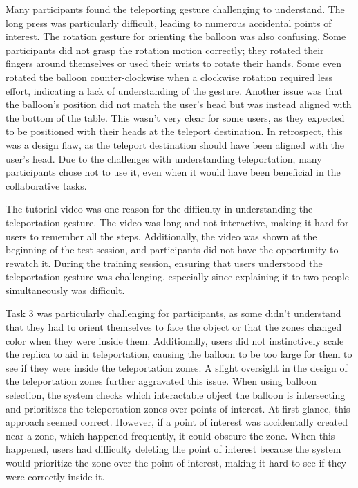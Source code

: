         Many participants found the teleporting gesture challenging to understand. The long press was particularly difficult, leading to numerous accidental points of interest. The rotation gesture for orienting the balloon was also confusing. Some participants did not grasp the rotation motion correctly; they rotated their fingers around themselves or used their wrists to rotate their hands. Some even rotated the balloon counter-clockwise when a clockwise rotation required less effort, indicating a lack of understanding of the gesture. Another issue was that the balloon's position did not match the user's head but was instead aligned with the bottom of the table. This wasn't very clear for some users, as they expected to be positioned with their heads at the teleport destination. In retrospect, this was a design flaw, as the teleport destination should have been aligned with the user's head. Due to the challenges with understanding teleportation, many participants chose not to use it, even when it would have been beneficial in the collaborative tasks.
             
        The tutorial video was one reason for the difficulty in understanding the teleportation gesture. The video was long and not interactive, making it hard for users to remember all the steps. Additionally, the video was shown at the beginning of the test session, and participants did not have the opportunity to rewatch it. During the training session, ensuring that users understood the teleportation gesture was challenging, especially since explaining it to two people simultaneously was difficult.

        Task 3 was particularly challenging for participants, as some didn't understand that they had to orient themselves to face the object or that the zones changed color when they were inside them. Additionally, users did not instinctively scale the replica to aid in teleportation, causing the balloon to be too large for them to see if they were inside the teleportation zones. A slight oversight in the design of the teleportation zones further aggravated this issue. When using balloon selection, the system checks which interactable object the balloon is intersecting and prioritizes the teleportation zones over points of interest. At first glance, this approach seemed correct. However, if a point of interest was accidentally created near a zone, which happened frequently, it could obscure the zone. When this happened, users had difficulty deleting the point of interest because the system would prioritize the zone over the point of interest, making it hard to see if they were correctly inside it.

